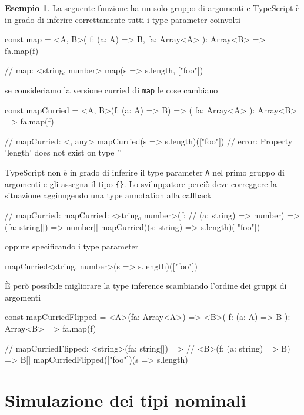 \documentclass[12pt]{article}
\theoremstyle{definition}
\newtheorem{example}{Esempio}[subsection]
\newenvironment{code}
  {\vspace{0.5cm} \VerbatimEnvironment\begin{typescriptcode}}
  {\end{typescriptcode} \vspace{0.2cm}}
\begin{document}
\begin{example}
La seguente funzione ha un solo gruppo di argomenti e TypeScript è in grado di inferire correttamente tutti i type parameter coinvolti

\begin{code}
const map = <A, B>(
  f: (a: A) => B,
  fa: Array<A>
): Array<B> => fa.map(f)

// map: <string, number>
map(s => s.length, ["foo"])
\end{code}

se consideriamo la versione curried di \texttt{map} le cose cambiano

\begin{code}
const mapCurried = <A, B>(f: (a: A) => B) => (
  fa: Array<A>
): Array<B> => fa.map(f)

// mapCurried: <{}, any>
mapCurried(s => s.length)(["foo"])
// error: Property 'length' does not exist on type '{}'
\end{code}

TypeScript non è in grado di inferire il type parameter \texttt{A} nel primo gruppo di argomenti e gli assegna il tipo \texttt{\{\}}.
Lo sviluppatore perciò deve correggere la situazione aggiungendo una type annotation alla callback

\begin{code}
// mapCurried: mapCurried: <string, number>(f:
// (a: string) => number) => (fa: string[]) => number[]
mapCurried((s: string) => s.length)(["foo"])
\end{code}

oppure specificando i type parameter

\begin{code}
mapCurried<string, number>(s => s.length)(["foo"])
\end{code}

È però possibile migliorare la type inference scambiando l'ordine dei gruppi di argomenti

\begin{code}
const mapCurriedFlipped = <A>(fa: Array<A>) => <B>(
  f: (a: A) => B
): Array<B> => fa.map(f)

// mapCurriedFlipped: <string>(fa: string[]) =>
// <B>(f: (a: string) => B) => B[]
mapCurriedFlipped(["foo"])(s => s.length)
\end{code}
\end{example}

\newpage
\section{Simulazione dei tipi nominali}
\end{document}

